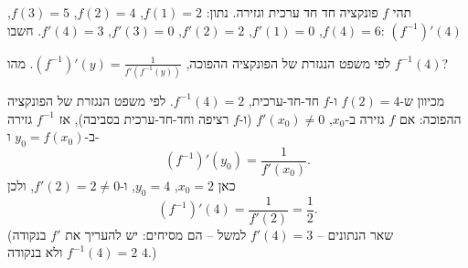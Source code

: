 
\begin{question}
תהי $f$ פונקציה חד חד ערכית וגזירה. נתון: $f(1)=2$, $f(2)=4$, $f(3)=5$, $f(4)=6$, $f'(1)=0$, $f'(2)=2$, $f'(3)=0$, $f'(4)=3$.
חשבו: $\left(f^{-1}\right)'(4)$
\end{question}

\begin{hint}
לפי משפט הנגזרת של הפונקציה ההפוכה, $(f^{-1})'(y)=\frac{1}{f'(f^{-1}(y))}$. מהו $f^{-1}(4)$?
\end{hint}

\begin{solution}
מכיוון ש-$f(2)=4$ ו-$f$ חד-חד-ערכית, $f^{-1}(4)=2$.
לפי משפט הנגזרת של הפונקציה ההפוכה: אם $f$ גזירה ב-$x_0$, $f'(x_0)\ne0$ (ו-$f$ רציפה וחד-חד-ערכית בסביבה), אז $f^{-1}$ גזירה ב-$y_0=f(x_0)$ ו-
\[ (f^{-1})'(y_0)=\frac{1}{f'(x_0)}. \]
כאן $x_0=2$, $y_0=4$, ו-$f'(2)=2\ne0$, ולכן
\[ \boxed{(f^{-1})'(4)=\frac{1}{f'(2)}=\frac12}. \]
(שאר הנתונים -- $f'(4)=3$ למשל -- הם מסיחים: יש להעריך את $f'$ בנקודה $f^{-1}(4)=2$ ולא בנקודה $4$.)
\end{solution}
